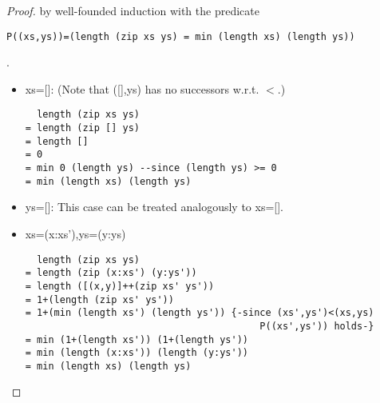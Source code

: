 \documentclass[]{article}
\theoremstyle{definition}
\begin{document}
\begin{proof} by well-founded induction with the predicate 
\begin{verbatim}
P((xs,ys))=(length (zip xs ys) = min (length xs) (length ys))
\end{verbatim}.
\begin{itemize}
\item[] xs=[]: (Note that ([],ys) has no successors w.r.t. $<$.)
\begin{verbatim}
  length (zip xs ys)
= length (zip [] ys)
= length []
= 0
= min 0 (length ys) --since (length ys) >= 0
= min (length xs) (length ys)
\end{verbatim}
\item[] ys=[]: This case can be treated analogously to xs=[].
\item[] xs=(x:xs'),ys=(y:ys)
\begin{verbatim}
  length (zip xs ys)
= length (zip (x:xs') (y:ys')) 
= length ([(x,y)]++(zip xs' ys'))
= 1+(length (zip xs' ys'))
= 1+(min (length xs') (length ys')) {-since (xs',ys')<(xs,ys) 
                                         P((xs',ys')) holds-}
= min (1+(length xs')) (1+(length ys'))
= min (length (x:xs')) (length (y:ys'))
= min (length xs) (length ys)
\end{verbatim}
\end{itemize}
\end{proof}
\newpage

\newpage

\end{document}
